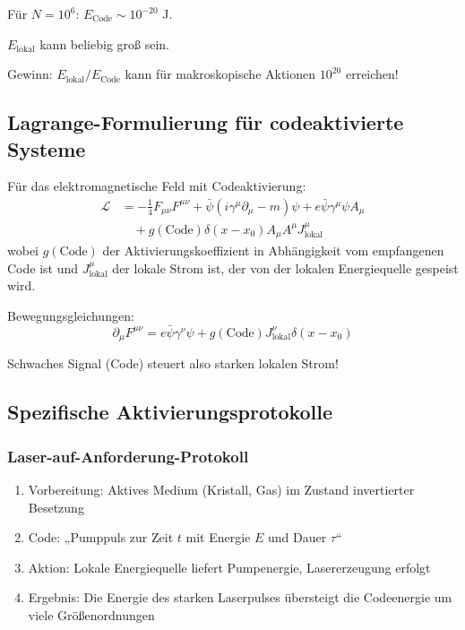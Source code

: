 \documentclass[11pt,a4paper]{article}
\begin{document}
	Für $N=10^6$: $E_{\text{Code}} \sim 10^{-20}$ J.
	
	$E_{\text{lokal}}$ kann beliebig groß sein.
	
	Gewinn: $E_{\text{lokal}} / E_{\text{Code}}$ kann für makroskopische Aktionen $10^{20}$ erreichen!
	
	\subsection{Lagrange-Formulierung für codeaktivierte Systeme}
	
	Für das elektromagnetische Feld mit Codeaktivierung:
	\begin{align}
		\mathcal{L} &= -\frac{1}{4} F_{\mu\nu} F^{\mu\nu} + \bar{\psi}(i\gamma^\mu\partial_\mu - m)\psi + e\bar{\psi}\gamma^\mu\psi A_\mu \\
		&\quad + g(\text{Code}) \delta(x - x_0) A_\mu A^\mu J_{\text{lokal}}^\mu
	\end{align}
	wobei $g(\text{Code})$ der Aktivierungskoeffizient in Abhängigkeit vom empfangenen Code ist und $J_{\text{lokal}}^\mu$ der lokale Strom ist, der von der lokalen Energiequelle gespeist wird.
	
	Bewegungsgleichungen:
	\begin{equation}
		\partial_\mu F^{\mu\nu} = e\bar{\psi}\gamma^\nu\psi + g(\text{Code}) J_{\text{lokal}}^\nu \delta(x - x_0)
	\end{equation}
	
	Schwaches Signal (Code) steuert also starken lokalen Strom!
	
	\subsection{Spezifische Aktivierungsprotokolle}
	
	\subsubsection{Laser-auf-Anforderung-Protokoll}
	\begin{enumerate}
		\item Vorbereitung: Aktives Medium (Kristall, Gas) im Zustand invertierter Besetzung
		\item Code: „Pumppuls zur Zeit $t$ mit Energie $E$ und Dauer $\tau$“
		\item Aktion: Lokale Energiequelle liefert Pumpenergie, Lasererzeugung erfolgt
		\item Ergebnis: Die Energie des starken Laserpulses übersteigt die Codeenergie um viele Größenordnungen
	\end{enumerate}
	
\end{document}
